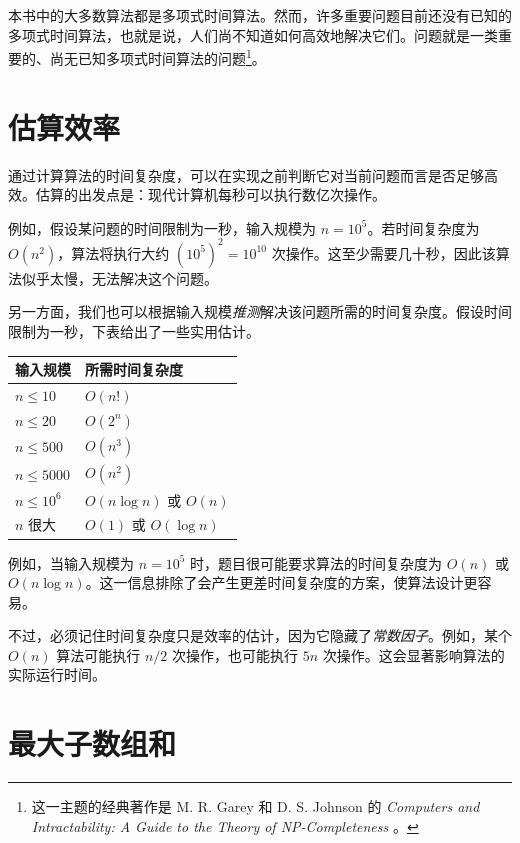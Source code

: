 
本书中的大多数算法都是多项式时间算法。然而，许多重要问题目前还没有已知的多项式时间算法，也就是说，人们尚不知道如何高效地解决它们。问题就是一类重要的、尚无已知多项式时间算法的问题\footnote{这一主题的经典著作是 M. R. Garey 和 D. S. Johnson 的 \emph{Computers and Intractability: A Guide to the Theory of NP-Completeness} \cite{gar79}。}。

\section{估算效率}

通过计算算法的时间复杂度，可以在实现之前判断它对当前问题而言是否足够高效。估算的出发点是：现代计算机每秒可以执行数亿次操作。

例如，假设某问题的时间限制为一秒，输入规模为 $n=10^5$。若时间复杂度为 $O(n^2)$，算法将执行大约 $(10^5)^2=10^{10}$ 次操作。这至少需要几十秒，因此该算法似乎太慢，无法解决这个问题。

另一方面，我们也可以根据输入规模\emph{推测}解决该问题所需的时间复杂度。假设时间限制为一秒，下表给出了一些实用估计。

\begin{center}
\begin{tabular}{ll}
输入规模 & 所需时间复杂度 \\
\hline
$n \le 10$ & $O(n!)$ \\
$n \le 20$ & $O(2^n)$ \\
$n \le 500$ & $O(n^3)$ \\
$n \le 5000$ & $O(n^2)$ \\
$n \le 10^6$ & $O(n \log n)$ 或 $O(n)$ \\
$n$ 很大 & $O(1)$ 或 $O(\log n)$ \\
\end{tabular}
\end{center}

例如，当输入规模为 $n=10^5$ 时，题目很可能要求算法的时间复杂度为 $O(n)$ 或 $O(n\log n)$。这一信息排除了会产生更差时间复杂度的方案，使算法设计更容易。


不过，必须记住时间复杂度只是效率的估计，因为它隐藏了\emph{常数因子}。例如，某个 $O(n)$ 算法可能执行 $n/2$ 次操作，也可能执行 $5n$ 次操作。这会显著影响算法的实际运行时间。

\section{最大子数组和}

